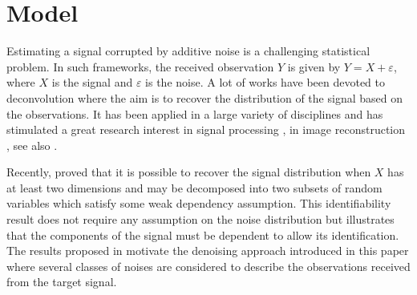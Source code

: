 \documentclass{article}
\begin{document}
\section{Model}
\label{sec:model}

Estimating a signal corrupted by additive noise  is a challenging statistical problem. In such frameworks, the received observation $Y$ is given by $Y = X + \varepsilon$,  where $X$ is the signal and $\varepsilon$ is the noise. A lot of works have been devoted to deconvolution where the aim is to recover the distribution of the signal based on the observations. It has been applied in a large variety of disciplines and has stimulated a great research interest in signal processing \cite{moulines1997maximum,attias1998blind}, in image reconstruction \cite{kundur1996blind,campisi2017blind}, see also  \cite{meister:2009}.


Recently, \cite{gassiat:lecorff:lehericy:2021} proved that it is possible to recover the signal distribution when $X$ has at least two dimensions and may be decomposed into two subsets of random variables which satisfy some weak dependency assumption. This identifiability result does not require any assumption on the noise distribution but illustrates that the components of the signal must be dependent to allow its identification. The results proposed in \cite{gassiat:lecorff:lehericy:2021} motivate the denoising approach introduced in this paper where several classes of noises are considered to describe the observations received from the target signal.  %
\end{document}
